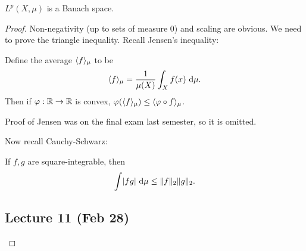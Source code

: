 \documentclass[10pt, twoside]{article}
\renewcommand{\d}{\ \mathrm{d}}
\begin{document}
    \begin{thm} $L^p(X,\mu)$ is a Banach space.  \begin{proof} Non-negativity
        (up to sets of measure $0$) and scaling are obvious. We need to prove
        the triangle inequality. Recall Jensen's inequality:
        \begin{mdframed}[style=default] \begin{thm} Define
            the average $\langle f\rangle_{\mu}$ to be \[\gen{f}_{\mu} =
            \frac{1}{\mu(X)} \int_X f(x) \d \mu.\] Then if $\varphi: \mathbb{R} \to \mathbb{R}$
            is convex, $\varphi(\langle f\rangle_{\mu}) \leq \langle\varphi \circ
            f\rangle_{\mu}$.  \end{thm} Proof of Jensen was on the final exam last
            semester, so it is omitted.  \end{mdframed} Now recall
            Cauchy-Schwarz: \begin{mdframed}[style=default]
                \begin{thm} If $f,g$ are square-integrable,
                    then \[ \int \abs{fg} \d \mu \leq \norm{f}_2 \norm{g}_2. \]
                \end{thm} \end{mdframed}
            
            \subsection{Lecture 11 (Feb 28)}
            

\end{proof}
\end{thm}
\end{document}
